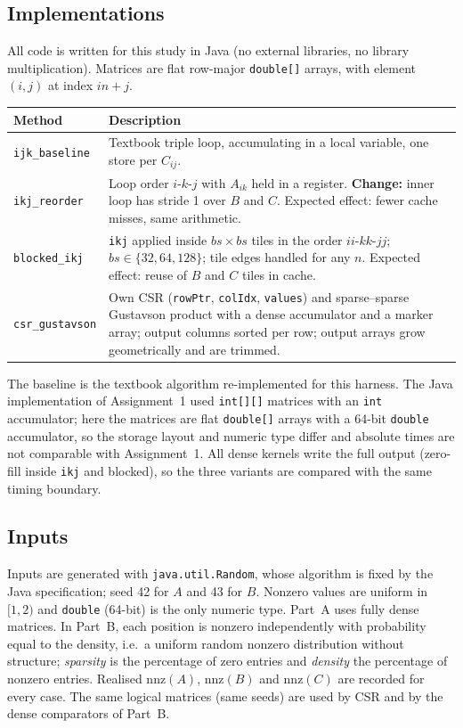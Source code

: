 \documentclass[11pt,a4paper]{article}
\begin{document}
\subsection{Implementations}
All code is written for this study in Java (no external libraries, no library multiplication). Matrices are flat row-major \texttt{double[]} arrays, with element $(i,j)$ at index $in+j$.
\begin{center}\small
\begin{tabular}{@{}lp{10.2cm}@{}}\toprule
Method & Description\\\midrule
\texttt{ijk\_baseline} & Textbook triple loop, accumulating in a local variable, one store per $C_{ij}$.\\
\texttt{ikj\_reorder} & Loop order $i$-$k$-$j$ with $A_{ik}$ held in a register. \textbf{Change:} inner loop has stride 1 over $B$ and $C$. Expected effect: fewer cache misses, same arithmetic.\\
\texttt{blocked\_ikj} & \texttt{ikj} applied inside $bs\times bs$ tiles in the order $ii$-$kk$-$jj$; $bs\in\{32,64,128\}$; tile edges handled for any $n$. Expected effect: reuse of $B$ and $C$ tiles in cache.\\
\texttt{csr\_gustavson} & Own CSR (\texttt{rowPtr}, \texttt{colIdx}, \texttt{values}) and sparse--sparse Gustavson product with a dense accumulator and a marker array; output columns sorted per row; output arrays grow geometrically and are trimmed.\\\bottomrule
\end{tabular}
\end{center}
The baseline is the textbook algorithm re-implemented for this harness. The Java implementation of Assignment~1 used \texttt{int[][]} matrices with an \texttt{int} accumulator; here the matrices are flat \texttt{double[]} arrays with a 64-bit \texttt{double} accumulator, so the storage layout and numeric type differ and absolute times are not comparable with Assignment~1. All dense kernels write the full output (zero-fill inside \texttt{ikj} and blocked), so the three variants are compared with the same timing boundary.

\subsection{Inputs}
Inputs are generated with \texttt{java.util.Random}, whose algorithm is fixed by the Java specification; seed 42 for $A$ and 43 for $B$. Nonzero values are uniform in $[1,2)$ and \texttt{double} (64-bit) is the only numeric type. Part~A uses fully dense matrices. In Part~B, each position is nonzero independently with probability equal to the density, i.e.\ a uniform random nonzero distribution without structure; \emph{sparsity} is the percentage of zero entries and \emph{density} the percentage of nonzero entries. Realised $\mathrm{nnz}(A)$, $\mathrm{nnz}(B)$ and $\mathrm{nnz}(C)$ are recorded for every case. The same logical matrices (same seeds) are used by CSR and by the dense comparators of Part~B.
\end{document}
